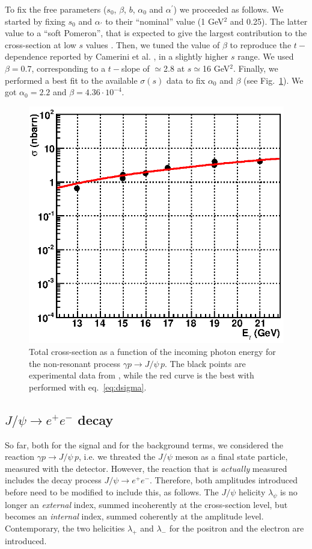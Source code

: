 \documentclass[a4paper,10pt]{article}
\begin{document}
To fix the free parameters ($s_0$, $\beta$, $b$, $\alpha_0$ and $\alpha^{\prime}$) we proceeded as follows. We started by fixing $s_0$ and $\alpha_{\prime}$ to their ``nominal'' value (1 GeV$^2$ and 0.25). The latter value to a ``soft Pomeron'', that is expected to give the largest contribution to the cross-section at low $s$ values \cite{Adloff:2000vm}. Then, we tuned the value of $\beta$ to reproduce the $t-$dependence reported by Camerini et al. \cite{Camerini:1975cy}, in a slightly higher $s$ range. We used $\beta=0.7$, corresponding to a $t-$slope of $\simeq$2.8 at $s\simeq$16 GeV$^2$. 
Finally, we performed a best fit to the available $\sigma(s)$ data to fix $\alpha_0$ and $\beta$ (see Fig.~\ref{fig:bck}). We got $\alpha_0=2.2$ and $\beta=4.36\cdot10^{-4}$.
\begin{figure}
\centering
\includegraphics[width=.6\textwidth]{bck.eps}
\caption{\small\label{fig:bck} Total cross-section as a function of the incoming photon energy for the non-resonant process  $\gamma p \rightarrow J/\psi \, p$. The black points are experimental data from \cite{Camerini:1975cy}, while the red curve is the best with performed with eq.~\ref{eq:dsigma}.}

\end{figure}








\subsection{$J/\psi \rightarrow e^+ e^-$ decay}

So far, both for the signal and for the background terms, we considered the reaction  $\gamma p \rightarrow J/\psi \, p$, i.e. we threated the $J/\psi$ meson as a final state particle, measured with the detector. However, the reaction that is \textit{actually} measured includes the decay process $J/\psi \rightarrow e^+ e^-$. Therefore, both amplitudes introduced before need to be modified to include this, as follows. The $J/\psi$ helicity $\lambda_\psi$ is no longer an \textit{external} index, summed incoherently at the cross-section level, but becomes an \textit{internal} index, summed coherently at the amplitude level. Contemporary, the two helicities $\lambda_+$ and $\lambda_-$ for the positron and the electron are introduced.
\end{document}
